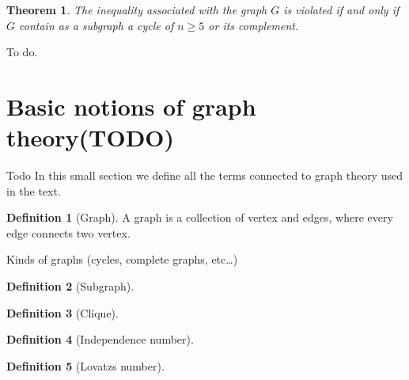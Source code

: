 \documentclass[a4paper]{article}
\newtheorem{theorem}{Theorem}[section]
\theoremstyle{definition}
\newtheorem{definition}{Definition}[section]
\let\oldproof\proof
\let\oldendproof\endproof
\renewenvironment{proof}
    {
        \begin{framed} 
        \oldproof
    }
    {
        \oldendproof 
        \end{framed}
    }
\begin{document}
\begin{theorem}
    The inequality associated with the graph $G$ is violated if and only if $G$
    contain as a subgraph a cycle of $n\ge5$ or its complement.
    \label{th:nc_graph_indinum}
\end{theorem}
\begin{proof}
    To do.
\end{proof}
\appendix
\section{Basic notions of graph theory(TODO)}
Todo
\label{sec:graph}
In this small section we define all the terms connected to graph theory used in
the text.
\begin{definition}[Graph]
    A graph is a collection of vertex and edges, where every edge connects two
    vertex.
\end{definition}
Kinds of graphs (cycles, complete graphs, etc\ldots)
\begin{definition}[Subgraph]
\end{definition}
\begin{definition}[Clique]
\end{definition}
\begin{definition}[Independence number]
\end{definition}
\begin{definition}[Lovatzs number]
\end{definition}
\end{document}
